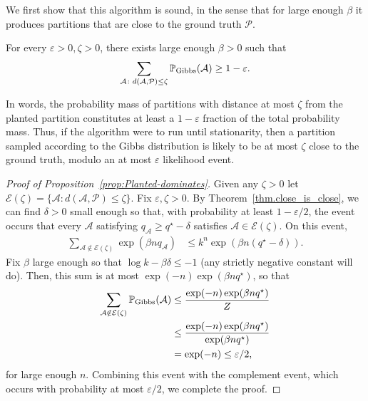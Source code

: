 \documentclass[a4paper,UKenglish,cleveref, autoref, thm-restate,numberwithinsect]{lipics-v2021}
\newcommand{\pr}{{\mathbb P}}
\newcommand{\eps}{\varepsilon}
\begin{document}
We first show that this algorithm is sound, in the sense that for large enough $\beta$ it produces  partitions that are close to the ground truth $\mathcal{P}$.

\begin{proposition}\label{prop:Planted-dominates}
For every $\eps>0,\zeta>0$, there exists large enough $\beta>0$ such that 
\begin{align*}
\sum_{\mathcal{A}\colon  d(\mathcal{A},\mathcal{P}) \le \zeta} \pr_{\rm Gibbs}(\mathcal{A}) \ge 1-\eps.
\end{align*}
\end{proposition}
In words, the probability mass of partitions with distance at most $\zeta$ from the planted partition constitutes
at least a $1-\eps$ fraction of the total probability mass.
Thus, if the algorithm were to run until stationarity, then a partition sampled according to the Gibbs distribution is likely to be at most $\zeta$ close to the ground truth, modulo an at most $\eps$ likelihood event.  


\begin{proof}[Proof of Proposition~\ref{prop:Planted-dominates}]
Given any  $\zeta>0$ let $\mathcal{E}(\zeta)=\lbrace \mathcal{A}\colon d(\mathcal{A},\mathcal{P})\le \zeta\rbrace$.
Fix $\eps,\zeta>0$. By Theorem~\ref{thm.close_is_close}, we can find $\delta>0$ small enough so that, with probability at least $1-\eps/2$,
the event occurs that every $\mathcal{A}$ satisfying $q_{\mathcal{A}}\ge q^{\star}-\delta$ satisfies $\mathcal{A}\in \mathcal{E}(\zeta)$.
On this event,
\begin{align*}
\sum_{\mathcal{A}\notin \mathcal{E}(\zeta)}\exp\left(\beta n q_{\mathcal{A}}\right)
&\le k^n\exp(\beta n (q^{\star}-\delta)).
\end{align*}
Fix $\beta$ large enough so that $\log k -\beta\delta \le -1$ (any strictly negative constant will do). Then, 
this sum is at most $\exp(-n)\exp(\beta n q^{\star})$, so that
\begin{align*}
\sum_{\mathcal{A}\notin \mathcal{E}(\zeta)}\pr_{\rm Gibbs}(\mathcal{A})
&\le
{\exp(-n)\exp(\beta n q^{\star}) \over Z} \\
& \le 
{\exp(-n)\exp(\beta n q^{\star}) \over \exp(\beta n q^{\star})}  \\
&=\exp(-n)\le \eps/2,
\end{align*}
for large enough $n$. Combining this event with the complement event, which occurs with probability at most $\eps/2$, we
complete the proof.
\end{proof}
\end{document}
